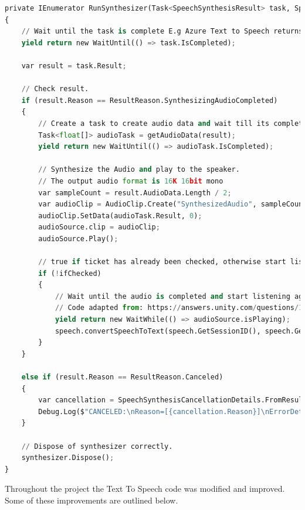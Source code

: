 \begin{lstlisting}[caption={Text to Speech - Asynchronous Audio Processing},label={lst:TTS3},language=python]
private IEnumerator RunSynthesizer(Task<SpeechSynthesisResult> task, SpeechConfig config, SpeechSynthesizer synthesizer)
{
    // Wait until the task is complete E.g Azure Text to Speech returns a result.
    yield return new WaitUntil(() => task.IsCompleted);

    var result = task.Result;
    
    // Check result.
    if (result.Reason == ResultReason.SynthesizingAudioCompleted)
    {
        // Create a task to create audio data and wait till its completed.
        Task<float[]> audioTask = getAudioData(result);
        yield return new WaitUntil(() => audioTask.IsCompleted);

        // Synthesize the Audio and play to the speaker.
        // The output audio format is 16K 16bit mono
        var sampleCount = result.AudioData.Length / 2;
        var audioClip = AudioClip.Create("SynthesizedAudio", sampleCount, 1, 16000, false);
        audioClip.SetData(audioTask.Result, 0);
        audioSource.clip = audioClip;
        audioSource.Play();
        
        // true if ticket has already been checked, otherwise start listening again until ticket has been checked.
        if (!ifChecked)
        {
            // Wait until the audio is completed and start listening again.
            // Code adapted from: https://answers.unity.com/questions/1111236/wait-for-audio-to-finish-and-then-load-scene.html
            yield return new WaitWhile(() => audioSource.isPlaying);
            speech.convertSpeechToText(speech.GetSessionID(), speech.GetPersona(), speech.GetVoiceName());
        }
    }

    else if (result.Reason == ResultReason.Canceled)
    {
        var cancellation = SpeechSynthesisCancellationDetails.FromResult(result);
        Debug.Log($"CANCELED:\nReason=[{cancellation.Reason}]\nErrorDetails=[{cancellation.ErrorDetails}]");
    }

    // Dispose of synthesizer correctly.
    synthesizer.Dispose();
}
\end{lstlisting}

\par
\medskip

Throughout the project the Text To Speech code was modified and improved. Some of these improvements are outlined below.

